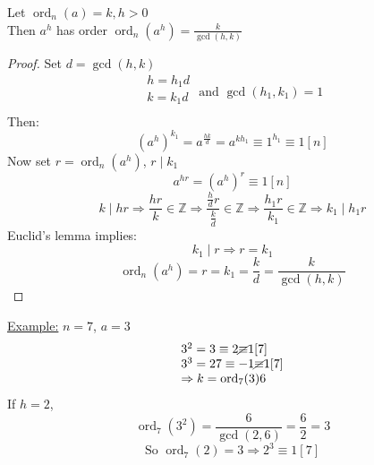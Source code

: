 \documentclass{report}
\newcommand{\nequiv}{\cancel{\equiv}}
\DeclareMathOperator{\ord}{ord}
\begin{document}
\begin{thm}
						Let $\ord_n(a)=k, h>0$\\
						Then $a^h$ has order $\ord_n(a^h)= \frac{k}{\gcd(h,k)}$\\
\end{thm}
\begin{proof}
							Set $d=\gcd(h,k)$\\
							\[\begin{array}{lcl}
								h=h_1d\\
								k=k_1d\\
								\end{array}
								\text{  and } \gcd(h_1,k_1)=1
								\]
Then: \[ (a^h)^{k_1}=a^{\frac{hk}{d}}=a^{kh_1}\equiv 1^{h_1} \equiv 1[n]\]
Now set $r=\ord_n(a^h)$, $r\mid k_1$\\
			\[a^{hr}=(a^h)^r\equiv 1 [n]\]
			\[k\mid hr \Rightarrow \frac{hr}{k} \in \mathbb{Z} \Rightarrow \frac{\frac{h}{d} r}{\frac{k}{d}} \in \mathbb{Z} \Rightarrow \frac{h_1 r}{k_1} \in \mathbb{Z}\Rightarrow k_1\mid h_1r\]
			\newpage
Euclid's lemma implies: \[ k_1 \mid r \Rightarrow r=k_1\]
												\[\ord_n(a^h)=r=k_1=\frac{k}{d}=\frac{k}{\gcd(h,k)}\]
\end{proof}
\underline{Example:} $n=7$,  $a=3$
										\[\begin{array}{lcl}
										3^2=3 \equiv 2 \nequiv 1[7]\\
										3^3=27 \equiv -1 \nequiv 1[7]\\
										\Rightarrow k=\ord_7(3)6\\
										\end{array}
										\]
					If $h=2$, \[\ord_7(3^2)=\frac{6}{\gcd(2,6)}=\frac{6}{2}=3\]
										\[\text{So }\ord_7(2)=3 \Rightarrow 2^3 \equiv 1[7]\]
\end{document}
